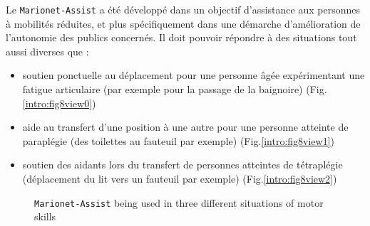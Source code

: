 Le {\tt Marionet-Assist} a été développé dans un objectif d'assistance aux personnes à mobilités réduites, et plus spécifiquement dans une démarche d'amélioration de l'autonomie des publics concernés. Il doit pouvoir répondre à des situations tout aussi diverses que :
\begin{itemize}
 \item soutien ponctuelle au déplacement pour une personne âgée expérimentant une fatigue articulaire (par exemple pour la passage de la baignoire) (Fig.\ref{intro:fig8view0})
 \item aide au transfert d'une position à une autre pour une personne atteinte de paraplégie (des toilettes au fauteuil par exemple) (Fig.\ref{intro:fig8view1})
 \item soutien des aidants lors du transfert de personnes atteintes de tétraplégie (déplacement du lit vers un fauteuil par exemple) (Fig.\ref{intro:fig8view2})
\end{itemize}

\begin{figure}[htp]
  \centering
   \hfill
   \hfill
   \hfill
    \caption{\footnotesize{{\tt Marionet-Assist} being used in three different situations of motor skills}}
\label{intro:fig8}
\end{figure}

